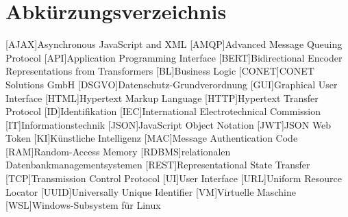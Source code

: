 \section{Abkürzungsverzeichnis}
\begin{acronym}[DSGVOO]
	[AJAX]{Asynchronous JavaScript and XML}
	[AMQP]{Advanced Message Queuing Protocol}
	[API]{Application Programming Interface}
	[BERT]{Bidirectional Encoder Representations from Transformers}
	[BL]{Business Logic}
	[CONET]{CONET Solutions GmbH}
	[DSGVO]{Datenschutz-Grundverordnung}
	[GUI]{Graphical User Interface}
	[HTML]{Hypertext Markup Language}
	[HTTP]{Hypertext Transfer Protocol}
	[ID]{Identifikation}
	[IEC]{International Electrotechnical Commission}
	[IT]{Informationstechnik}
	[JSON]{JavaScript Object Notation}
	[JWT]{JSON Web Token}
	[KI]{Künstliche Intelligenz}
	[MAC]{Message Authentication Code}
	[RAM]{Random-Access Memory}
	[RDBMS]{relationalen Datenbankmanagementsystemen}
	[REST]{Representational State Transfer}
	[TCP]{Transmission Control Protocol}
	[UI]{User Interface}
	[URL]{Uniform Resource Locator}
	[UUID]{Universally Unique Identifier}
	[VM]{Virtuelle Maschine}
	[WSL]{Windows-Subsystem für Linux}
	
\end{acronym}
